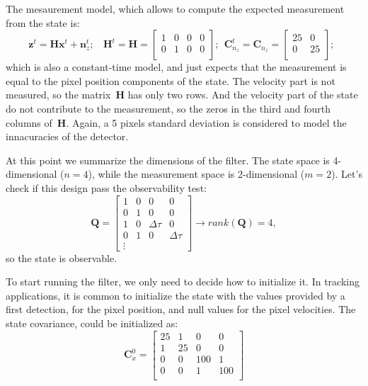 The mesaurement model, which allows to compute the expected measurement from the state is:
\begin{equation}
 \mathbf{z}^t = \mathbf{H}\mathbf{x}^{t} + \mathbf{n}^t_{z}; \ \ \ \
\mathbf{H}^t = \mathbf{H} = 
\left[
 \begin{array}{cccc}
  1 & 0 & 0 & 0 \\
  0 & 1 & 0 & 0 \\
 \end{array}
 \right]; \ \ 
 \mathbf{C}^t_{n_z} = \mathbf{C}_{n_z} = 
\left[
 \begin{array}{cc}
  25 & 0 \\
  0 & 25 \\
 \end{array}
 \right]; \ \ 
\end{equation}
which is also a constant-time model, and just expects that the measurement is equal to the pixel position components of the state. The velocity part is not measured, so the matrix~$\mathbf{H}$ has only two rows. And the velocity part of the state do not contribute to the measurement, so the zeros in the third and fourth columns of~$\mathbf{H}$. Again, a 5 pixels standard deviation is considered to model the innacuracies of the detector. 

At this point we summarize the dimensions of the filter. The state space is 4-dimensional ($n=4$), while the measurement space is 2-dimensional ($m=2$). Let's check if this design pass the observability test:
\begin{equation}
 \mathbf{Q} = 
 \left[
 \begin{array}{cccc}
  1 & 0 & 0 & 0 \\
  0 & 1 & 0 & 0 \\
  1 & 0 & \Delta\tau & 0 \\
  0 & 1 & 0 & \Delta\tau \\
  \vdots  
 \end{array}
\right]
\longrightarrow rank(\mathbf{Q})=4, 
\end{equation}
so the state is observable. 

To start running the filter, we only need to decide how to initialize it. In tracking applications, it is common to initialize the state with the values provided by a first detection, for the pixel position, and null values for the pixel velocities. The state covariance, could be initialized as:
\begin{equation}
 \mathbf{C}^0_x = 
 \left[
 \begin{array}{cccc}
  25 & 1 & 0 & 0 \\
  1 & 25 & 0 & 0 \\
  0 & 0 & 100 & 1 \\
  0 & 0 & 1 & 100 \\
 \end{array}
 \right]
\end{equation}

